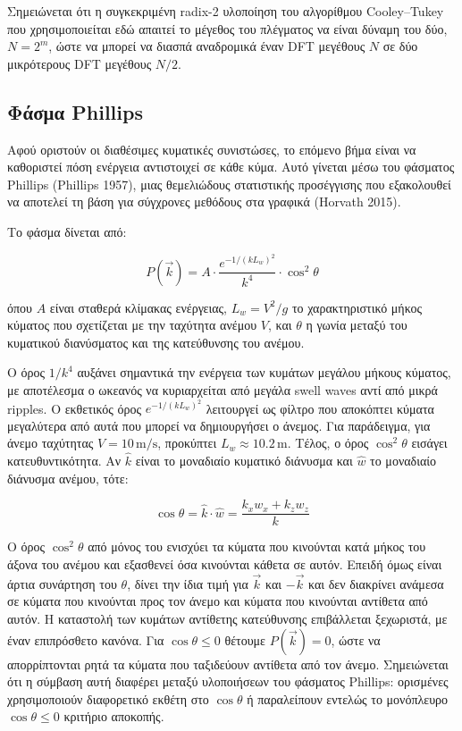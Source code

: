 Σημειώνεται ότι η συγκεκριμένη radix-2 υλοποίηση του αλγορίθμου
Cooley--Tukey που χρησιμοποιείται εδώ απαιτεί το μέγεθος του πλέγματος
να είναι δύναμη του δύο, \(N = 2^m\), ώστε να μπορεί να διασπά
αναδρομικά έναν DFT μεγέθους \(N\) σε δύο μικρότερους DFT μεγέθους
\(N/2\).

\subsection{Φάσμα Phillips}\label{ux3c6ux3acux3c3ux3bcux3b1-phillips}

Αφού οριστούν οι διαθέσιμες κυματικές συνιστώσες, το επόμενο βήμα είναι
να καθοριστεί πόση ενέργεια αντιστοιχεί σε κάθε κύμα. Αυτό γίνεται μέσω
του φάσματος Phillips (Phillips 1957), μιας θεμελιώδους στατιστικής
προσέγγισης που εξακολουθεί να αποτελεί τη βάση για σύγχρονες μεθόδους
στα γραφικά (Horvath 2015).

Το φάσμα δίνεται από:

\[
P(\vec{k}) =
A
\cdot
\frac{e^{-1/(kL_w)^2}}{k^4}
\cdot
\cos^2\theta
\]

όπου \(A\) είναι σταθερά κλίμακας ενέργειας, \(L_w = V^2/g\) το
χαρακτηριστικό μήκος κύματος που σχετίζεται με την ταχύτητα ανέμου
\(V\), και \(\theta\) η γωνία μεταξύ του κυματικού διανύσματος και της
κατεύθυνσης του ανέμου.

Ο όρος \(1/k^4\) αυξάνει σημαντικά την ενέργεια των κυμάτων μεγάλου
μήκους κύματος, με αποτέλεσμα ο ωκεανός να κυριαρχείται από μεγάλα swell
waves αντί από μικρά ripples. Ο εκθετικός όρος \(e^{-1/(kL_w)^2}\)
λειτουργεί ως φίλτρο που αποκόπτει κύματα μεγαλύτερα από αυτά που μπορεί
να δημιουργήσει ο άνεμος. Για παράδειγμα, για άνεμο ταχύτητας
\(V=10\,\text{m/s}\), προκύπτει \(L_w \approx 10.2\,\text{m}\). Τέλος, ο
όρος \(\cos^2\theta\) εισάγει κατευθυντικότητα. Αν \(\hat{k}\) είναι το
μοναδιαίο κυματικό διάνυσμα και \(\hat{w}\) το μοναδιαίο διάνυσμα
ανέμου, τότε:

\[
\cos\theta
=
\hat{k}\cdot\hat{w}
=
\frac{k_xw_x + k_zw_z}{k}
\]

Ο όρος \(\cos^2\theta\) από μόνος του ενισχύει τα κύματα που κινούνται
κατά μήκος του άξονα του ανέμου και
εξασθενεί όσα κινούνται κάθετα σε αυτόν. Επειδή όμως είναι άρτια
συνάρτηση του \(\theta\), δίνει την ίδια τιμή για \(\vec{k}\) και
\(-\vec{k}\) και δεν διακρίνει ανάμεσα σε κύματα που
κινούνται προς τον άνεμο και κύματα που κινούνται αντίθετα από αυτόν.
Η καταστολή των κυμάτων αντίθετης κατεύθυνσης επιβάλλεται ξεχωριστά, με
έναν επιπρόσθετο κανόνα. Για \(\cos\theta \le 0\) θέτουμε
\(P(\vec{k}) = 0\), ώστε να απορρίπτονται ρητά τα κύματα που ταξιδεύουν
αντίθετα από τον άνεμο. Σημειώνεται ότι η σύμβαση αυτή διαφέρει μεταξύ
υλοποιήσεων του φάσματος Phillips: ορισμένες χρησιμοποιούν διαφορετικό
εκθέτη στο \(\cos\theta\) ή παραλείπουν εντελώς το μονόπλευρο
\(\cos\theta\le 0\) κριτήριο αποκοπής.

